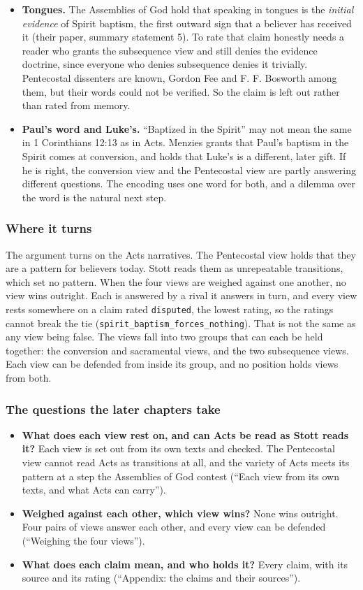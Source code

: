 \documentclass[11pt]{article}
\begin{document}
\begin{itemize}
  \item \textbf{Tongues.} The Assemblies of God hold that speaking in tongues is the \emph{initial evidence} of Spirit baptism, the first outward sign that a believer has received it (their paper, summary statement 5). To rate that claim honestly needs a reader who grants the subsequence view and still denies the evidence doctrine, since everyone who denies subsequence denies it trivially. Pentecostal dissenters are known, Gordon Fee and F. F. Bosworth among them, but their words could not be verified. So the claim is left out rather than rated from memory.
  \item \textbf{Paul’s word and Luke’s.} “Baptized in the Spirit” may not mean the same in 1 Corinthians 12:13 as in Acts. Menzies grants that Paul’s baptism in the Spirit comes at conversion, and holds that Luke’s is a different, later gift. If he is right, the conversion view and the Pentecostal view are partly answering different questions. The encoding uses one word for both, and a dilemma over the word is the natural next step.
\end{itemize}
\subsubsection*{Where it turns}
The argument turns on the Acts narratives. The Pentecostal view holds that they are a pattern for believers today. Stott reads them as unrepeatable transitions, which set no pattern. When the four views are weighed against one another, no view wins outright. Each is answered by a rival it answers in turn, and every view rests somewhere on a claim rated \texttt{disputed}, the lowest rating, so the ratings cannot break the tie (\texttt{spirit\_\allowbreak{}baptism\_\allowbreak{}forces\_\allowbreak{}nothing}). That is not the same as any view being false. The views fall into two groups that can each be held together: the conversion and sacramental views, and the two subsequence views. Each view can be defended from inside its group, and no position holds views from both.

\subsubsection*{The questions the later chapters take}
\begin{itemize}
  \item \textbf{What does each view rest on, and can Acts be read as Stott reads it?} Each view is set out from its own texts and checked. The Pentecostal view cannot read Acts as transitions at all, and the variety of Acts meets its pattern at a step the Assemblies of God contest (“Each view from its own texts, and what Acts can carry”).
  \item \textbf{Weighed against each other, which view wins?} None wins outright. Four pairs of views answer each other, and every view can be defended (“Weighing the four views”).
  \item \textbf{What does each claim mean, and who holds it?} Every claim, with its source and its rating (“Appendix: the claims and their sources”).
\end{itemize}
\end{document}

